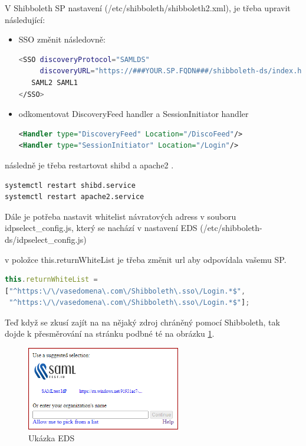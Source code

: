 V Shibboleth SP nastavení (/etc/shibboleth/shibboleth2.xml), je třeba upravit následující:\\
 \begin{itemize}
    \item
SSO změnit následovně:

\begin{lstlisting}[language=Bash]
<SSO discoveryProtocol="SAMLDS" 
     discoveryURL="https://###YOUR.SP.FQDN###/shibboleth-ds/index.html">
   SAML2 SAML1
</SSO>
\end{lstlisting}
\item
odkomentovat DiscoveryFeed handler a SessionInitiator handler

\begin{lstlisting}[language=xml]
<Handler type="DiscoveryFeed" Location="/DiscoFeed"/>
<Handler type="SessionInitiator" Location="/Login"/>
\end{lstlisting}
\end{itemize}
následně je třeba restartovat shibd a apache2 .

\begin{lstlisting}[language=Bash]
systemctl restart shibd.service
systemctl restart apache2.service
\end{lstlisting}

Dále je potřeba nastavit whitelist návratových adress v souboru idpselect\_config.js, který se nachází v nastavení EDS (/etc/shibboleth-ds/idpselect\_config.js)

v položce this.returnWhiteList je třeba změnit url aby odpovídala vašemu SP. 

\begin{lstlisting}[language=javascript]
this.returnWhiteList = 
["^https:\/\/vasedomena\.com\/Shibboleth\.sso\/Login.*$",
 "^https:\/\/vasedomena\.com\/Shibboleth\.sso\/Login.*$"];
\end{lstlisting}

Teď když se zkusí zajít na na nějaký zdroj chráněný pomocí Shibboleth, tak dojde k přesměrování na stránku podbné té na obrázku \ref{EDS}.

\begin{figure}[bp]
	\centering
    \includegraphics[width=0.6\textwidth]{obrazky-figures/disc.png}
	\caption{Ukázka EDS}
	\label{EDS}
\end{figure}


